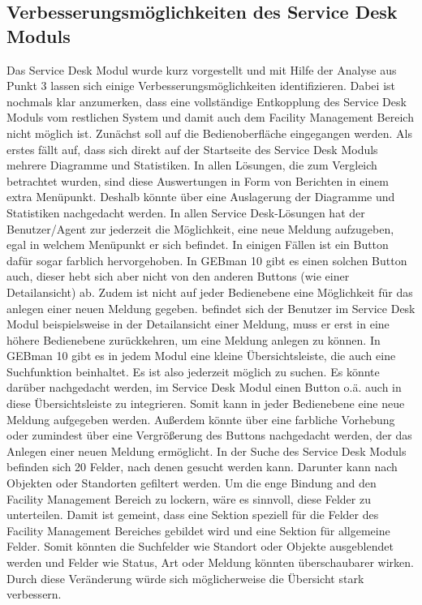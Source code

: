 \subsection{Verbesserungsmöglichkeiten des Service Desk Moduls}
\noindent
Das Service Desk Modul wurde kurz vorgestellt und mit Hilfe der Analyse aus Punkt 3 lassen sich einige Verbesserungsmöglichkeiten identifizieren. Dabei ist nochmals klar anzumerken, dass eine vollständige Entkopplung des Service Desk Moduls vom restlichen System und damit auch dem Facility Management Bereich nicht möglich ist.\newline
Zunächst soll auf die Bedienoberfläche eingegangen werden. Als erstes fällt auf, dass sich direkt auf der Startseite des Service Desk Moduls mehrere Diagramme und Statistiken. In allen Lösungen, die zum Vergleich betrachtet wurden, sind diese Auswertungen in Form von Berichten in einem extra Menüpunkt. Deshalb könnte über eine Auslagerung der Diagramme und Statistiken nachgedacht werden.\newline
In allen Service Desk-Lösungen hat der Benutzer/Agent zur jederzeit die Möglichkeit, eine neue Meldung aufzugeben, egal in welchem Menüpunkt er sich befindet. In einigen Fällen ist ein Button dafür sogar farblich hervorgehoben. In GEBman 10 gibt es einen solchen Button auch, dieser hebt sich aber nicht von den anderen Buttons (wie einer Detailansicht) ab. Zudem ist nicht auf jeder Bedienebene eine Möglichkeit für das anlegen einer neuen Meldung gegeben. befindet sich der Benutzer im Service Desk Modul beispielsweise in der Detailansicht einer Meldung, muss er erst in eine höhere Bedienebene zurückkehren, um eine Meldung anlegen zu können. In GEBman 10 gibt es in jedem Modul eine kleine Übersichtsleiste, die auch eine Suchfunktion beinhaltet. Es ist also jederzeit möglich zu suchen. Es könnte darüber nachgedacht werden, im Service Desk Modul einen Button o.ä. auch in diese Übersichtsleiste zu integrieren. Somit kann in jeder Bedienebene eine neue Meldung aufgegeben werden. Außerdem könnte über eine farbliche Vorhebung oder zumindest über eine Vergrößerung des Buttons nachgedacht werden, der das Anlegen einer neuen Meldung ermöglicht.\newline
In der Suche des Service Desk Moduls befinden sich 20 Felder, nach denen gesucht werden kann. Darunter kann nach Objekten oder Standorten gefiltert werden. Um die enge Bindung and den Facility Management Bereich zu lockern, wäre es sinnvoll, diese Felder zu unterteilen. Damit ist gemeint, dass eine Sektion speziell für die Felder des Facility Management Bereiches gebildet wird und eine Sektion für allgemeine Felder. Somit könnten die Suchfelder wie Standort oder Objekte ausgeblendet werden und Felder wie Status, Art oder Meldung könnten überschaubarer wirken. Durch diese Veränderung würde sich möglicherweise die Übersicht stark verbessern. \\

